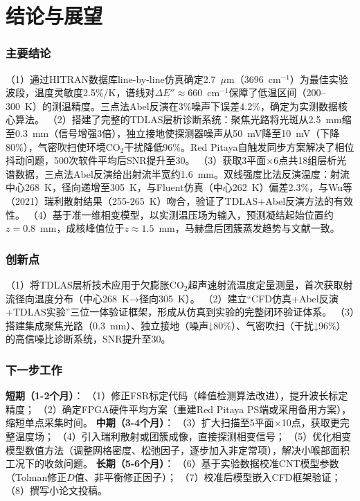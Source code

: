 ﻿\chapter{结论与展望}
	\subsection{主要结论}
	（1）通过HITRAN数据库line-by-line仿真确定2.7~$\mu$m（3696~cm$^{-1}$）为最佳实验波段，温度灵敏度2.5\%/K，谱线对$\Delta E''\approx660$~cm$^{-1}$保障了低温区间（200--300~K）的测温精度。三点法Abel反演在3\%噪声下误差4.2\%，确定为实测数据核心算法。
	（2）搭建了完整的TDLAS层析诊断系统：聚焦光路将光斑从2.5~mm缩至0.3~mm（信号增强3倍），独立接地使探测器噪声从50~mV降至10~mV（下降80\%），气密吹扫使环境CO$_2$干扰降低96\%。Red Pitaya自触发同步方案解决了相位抖动问题，500次软件平均后SNR提升至30。
	（3）获取3平面$\times$6点共18组层析光谱数据，三点法Abel反演给出射流半宽约1.6~mm。双线强度比法反演温度：射流中心268~K，径向递增至305~K，与Fluent仿真（中心262~K）偏差2.3\%，与Wu等（2021）瑞利散射结果（255-265~K）吻合，验证了TDLAS+Abel反演方法的有效性。
	（4）基于准一维相变模型，以实测温压场为输入，预测凝结起始位置约$z=0.8$~mm，成核峰值位于$z\approx1.5$~mm，马赫盘后团簇蒸发趋势与文献一致。
	\subsection{创新点}
	（1）将TDLAS层析技术应用于欠膨胀CO$_2$超声速射流温度定量测量，首次获取射流径向温度分布（中心268~K→径向305~K）。
	（2）建立“CFD仿真+Abel反演+TDLAS实验”三位一体验证框架，形成从仿真到实验的完整闭环验证体系。
	（3）搭建集成聚焦光路（0.3~mm）、独立接地（噪声↓80\%）、气密吹扫（干扰↓96\%）的高信噪比诊断系统，SNR提升至30。
	\subsection{下一步工作}
	\textbf{短期（1-2个月）}：
	（1）修正FSR标定代码（峰值检测算法改进），提升波长标定精度；
	（2）确定FPGA硬件平均方案（重建Red Pitaya PS端或采用备用方案），缩短单点采集时间。
	\textbf{中期（3-4个月）}：
	（3）扩大扫描至5平面$\times$10点，获取更完整温度场；
	（4）引入瑞利散射或团簇成像，直接探测相变信号；
	（5）优化相变模型数值方法（调整网格密度、松弛因子，逐步加入非定常项），解决小喉部面积工况下的收敛问题。
	\textbf{长期（5-6个月）}：
	（6）基于实验数据校准CNT模型参数（Tolman修正$D$值、非平衡修正因子）；
	（7）校准后模型嵌入CFD框架验证；
	（8）撰写小论文投稿。

